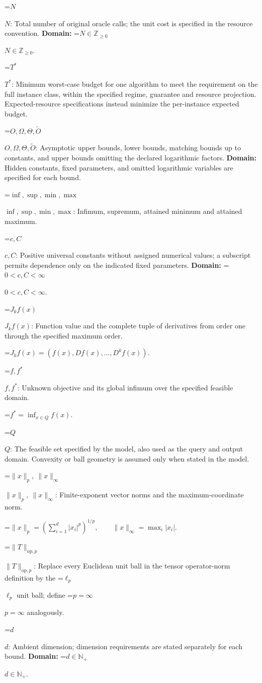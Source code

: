 \documentclass[10pt,a4paper]{article}
\newcommand{\AtlasMath}[1]{\par\begingroup\centering\setbox0=\hbox{$\displaystyle #1$}\ifdim\wd0>1.4\linewidth\typeout{ATLAS WIDE FORMULA: \the\wd0}\fi\ifdim\wd0>\linewidth\resizebox{\linewidth}{!}{\box0}\else\box0\fi\par\endgroup}
\newcommand{\AtlasInlineMath}[1]{\begingroup\setbox0=\hbox{$#1$}\ifdim\wd0>.4\linewidth\endgroup\AtlasMath{#1}\else\endgroup$#1$\fi}
\begin{document}
\AtlasInlineMath{N}: Total number of original oracle calls; the unit cost is specified in the resource convention. \textbf{Domain:} \AtlasInlineMath{N\in\mathbb{Z}_{\ge0}}.

\AtlasInlineMath{T^*}: Minimum worst-case budget for one algorithm to meet the requirement on the full instance class, within the specified regime, guarantee and resource projection. Expected-resource specifications instead minimize the per-instance expected budget.

\AtlasInlineMath{O,\Omega,\Theta,\widetilde{O}}: Asymptotic upper bounds, lower bounds, matching bounds up to constants, and upper bounds omitting the declared logarithmic factors. \textbf{Domain:} Hidden constants, fixed parameters, and omitted logarithmic variables are specified for each bound.

\AtlasInlineMath{\inf,\sup,\min,\max}: Infimum, supremum, attained minimum and attained maximum.

\AtlasInlineMath{c,C}: Positive universal constants without assigned numerical values; a subscript permits dependence only on the indicated fixed parameters. \textbf{Domain:} \AtlasInlineMath{0<c,C<\infty}.

\AtlasInlineMath{J_{k}f(x)}: Function value and the complete tuple of derivatives from order one through the specified maximum order.


\AtlasMath{J_{k}f(x)=(f(x),Df(x),\ldots,D^{k}f(x)).}


\AtlasInlineMath{f,f^*}: Unknown objective and its global infimum over the specified feasible domain.


\AtlasMath{f^*=\inf_{x\in Q}f(x).}


\AtlasInlineMath{Q}: The feasible set specified by the model, also used as the query and output domain. Convexity or ball geometry is assumed only when stated in the model.

\AtlasInlineMath{\|x\|_p,\ \|x\|_\infty}: Finite-exponent vector norms and the maximum-coordinate norm.


\AtlasMath{\|x\|_p=\left(\sum_{i=1}^d|x_i|^p\right)^{1/p},\qquad\|x\|_\infty=\max_i|x_i|.}


\AtlasInlineMath{\|T\|_{\mathrm{op},p}}: Replace every Euclidean unit ball in the tensor operator-norm definition by the \AtlasInlineMath{\ell_p} unit ball; define \AtlasInlineMath{p=\infty} analogously.

\AtlasInlineMath{d}: Ambient dimension; dimension requirements are stated separately for each bound. \textbf{Domain:} \AtlasInlineMath{d\in\mathbb{N}_{+}}.
\end{document}
